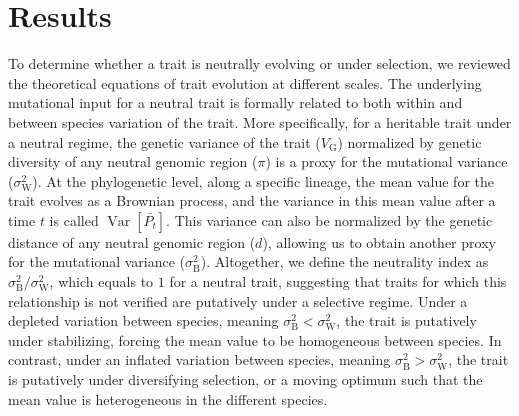 \documentclass{article}
\DeclareMathOperator{\Var}{\text{Var}}
\newcommand{\Time}{t}
\newcommand{\Trait}{P}
\newcommand{\MeanTrait}{\bar{\Trait_{\Time}}}
\newcommand{\VarPhy}{\Var \left[\MeanTrait\right]}
\newcommand{\VarGenetic}{V_{\mathrm{G}}}
\newcommand{\RatePhy}{\sigma^2_{\mathrm{B}}}
\newcommand{\RatePop}{\sigma^2_{\mathrm{W}}}
\begin{document}
\section{Results}

To determine whether a trait is neutrally evolving or under selection, we reviewed the theoretical equations of trait evolution at different scales.
The underlying mutational input for a neutral trait is formally related to both within and between species variation of the trait.
More specifically, for a heritable trait under a neutral regime, the genetic variance of the trait ($\VarGenetic$) normalized by genetic diversity of any neutral genomic region ($\pi$) is a proxy for the mutational variance ($\RatePop$).
At the phylogenetic level, along a specific lineage, the mean value for the trait evolves as a Brownian process, and the variance in this mean value after a time $\Time$ is called $\VarPhy$.
This variance can also be normalized by the genetic distance of any neutral genomic region ($d$), allowing us to obtain another proxy for the mutational variance ($\RatePhy$).
Altogether, we define the neutrality index as $\RatePhy/\RatePop$, which equals to $1$ for a neutral trait, suggesting that traits for which this relationship is not verified are putatively under a selective regime.
Under a depleted variation between species, meaning $\RatePhy < \RatePop$, the trait is putatively under stabilizing, forcing the mean value to be homogeneous between species.
In contrast, under an inflated variation between species, meaning $\RatePhy > \RatePop$, the trait is putatively under diversifying selection, or a moving optimum such that the mean value is heterogeneous in the different species.
\end{document}
